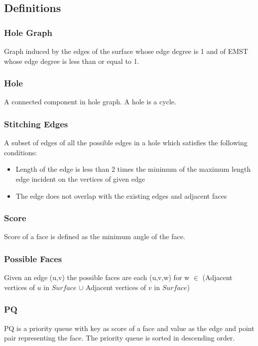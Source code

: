 \documentclass[12pt,a4paper]{article}
\begin{document}
\subsection{Definitions}

\subsubsection{Hole Graph}Graph induced by the edges of the surface whose edge degree is 1 and of EMST whose edge degree is less than or equal to 1.

\subsubsection{Hole}A connected component in hole graph. A hole is a cycle. 

\subsubsection{Stitching Edges} A subset of edges of all the possible edges in a hole which satisfies the following conditions:
\begin{itemize}
	\item Length of the edge is less than 2 times the minimum of the maximum length edge incident on the vertices of given edge
	\item The edge does not overlap with the existing edges and adjacent faces  
\end{itemize}

\subsubsection{Score} Score of a face is defined as the minimum angle of the face.

\subsubsection{Possible Faces} Given an edge (u,v) the possible faces are each (u,v,w) for w $ \in $ (Adjacent vertices of $ u $ in $ Surface  $ $ \cup $ Adjacent vertices of $ v $ in $Surface $)

\subsubsection{PQ} PQ is a priority queue with key as score of a face and value as the edge and point pair representing the face. The priority queue is sorted in descending order.
\end{document}
